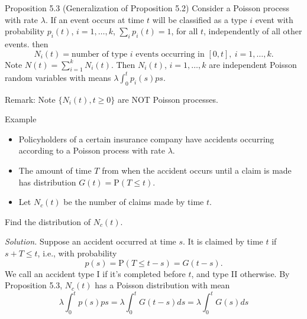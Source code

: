 \documentclass[letterpaper,handout, mathserif]{beamer}
\def\p{\mathrm P}
\begin{document}
\begin{frame}{Proposition 5.3 (Generalization of Proposition 5.2)}
Consider a Poisson process with rate $\lambda$.
If an event occurs at time $t$ will be classified as a type $i$ event with probability $p_i(t)$, $i=1,\ldots,k$,
$\sum_i p_i(t) =1$, for all $t$, independently of all other events.
then
$$N_i(t)= \mbox{number of type }i \mbox{ events occurring in }[0, t], \ i = 1,\ldots,k.$$
Note $N(t)=\sum_{i=1}^{k}N_i(t)$. Then
$N_i(t)$, $i=1,\ldots,k$ are independent Poisson random variables with means $\lambda\int_0^t p_i(s)ps.$\bigskip


Remark: Note $\{N_i(t), t\ge 0\}$ are NOT Poisson processes.
\end{frame}
\begin{frame}{Example}%
\begin{itemize}
\item Policyholders of a certain insurance company have accidents occurring
according to a Poisson process with rate $\lambda$.
\item The amount of time $T$ from when the
accident occurs until a claim is made has distribution $G(t)=\p(T\le t)$.
\item Let $N_c(t)$ be the number of claims made by time $t$.
\end{itemize}
Find the distribution of $N_c(t)$.\bigskip

{\em Solution.} Suppose an accident occurred at time $s$.
It is claimed by time $t$ if $s+T\le t$, i.e., with probability $$p(s)=\p(T\le t-s)=G(t-s).$$
We call an accident type I if it's completed before $t$, and type II otherwise.
By Proposition 5.3, $N_c(t)$ has a Poisson distribution with mean
$$
\lambda\int_0^t p(s)ps=\lambda\int_0^t G(t-s)ds=\lambda\int_0^t G(s)ds
$$
\end{frame}
\end{document}
